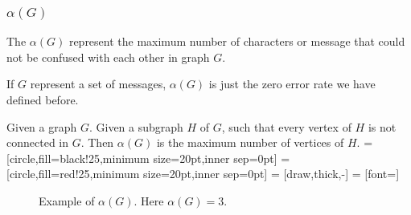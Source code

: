 \documentclass{beamer}
\begin{document}
                  \begin{frame}
                        \frametitle{$\alpha(G)$}
                        \begin{definition}[$\alpha(G)$]\label{def:alpha}
                              The $\alpha(G)$ represent the maximum number of characters or message that could not be confused with each other in graph $G$.

                              If $G$ represent a set of messages, $\alpha(G)$ is just the zero error rate we have defined before.

                              \pause

                              Given a graph $ G $. Given a subgraph $ H $ of $ G $, such that every vertex of $ H $ is not connected in $ G $. Then $ \alpha(G) $ is the maximum number of vertices of $ H $.
                              =[circle,fill=black!25,minimum size=20pt,inner sep=0pt]
                              =[circle,fill=red!25,minimum size=20pt,inner sep=0pt]
                               = [draw,thick,-]
                               = [font=\small]
                              \begin{figure}[h!]
                                    \label{fig:alphaGExample}
                                    \caption{Example of $ \alpha(G) $. Here $ \alpha(G) = 3 $.}
                              \end{figure}
                        \end{definition}
                  \end{frame}
\end{document}
